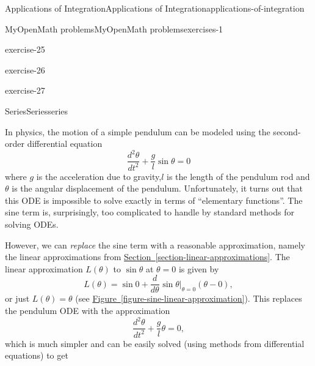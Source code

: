 \documentclass[oneside,10pt,]{book}
\numberwithin{equation}{section}
\newcommand{\dv}[3][]{\dfrac{d^{#1} #2}{d #3^{#1}}}
\begin{document}
\begin{chapterptx}{Applications of Integration}{}{Applications of Integration}{}{}{applications-of-integration}
\begin{exercises-section}{MyOpenMath problems}{}{MyOpenMath problems}{}{}{exercises-1}
\begin{exercisegroup}
\begin{divisionexerciseeg}{25}{}{}{exercise-25}%
\end{divisionexerciseeg}%
\begin{divisionexerciseeg}{26}{}{}{exercise-26}%
\end{divisionexerciseeg}%
\begin{divisionexerciseeg}{27}{}{}{exercise-27}%
\end{divisionexerciseeg}%
\end{exercisegroup}
\par\medskip\noindent
\end{exercises-section}
\end{chapterptx}
%
%
\typeout{************************************************}
\typeout{************************************************}
%
\begin{chapterptx}{Series}{}{Series}{}{}{series}
\begin{introduction}{}%
\hypertarget{p-777}{}%
In physics, the motion of a simple pendulum can be modeled using the second-order differential equation%
\begin{equation*}
\dv[2]{\theta}{t} + \frac{g}{l}\sin\theta = 0
\end{equation*}
where \(g\) is the acceleration due to gravity,\(l\) is the length of the pendulum rod and \(\theta\) is the angular displacement of the pendulum. Unfortunately, it turns out that this ODE is impossible to solve exactly in terms of ``elementary functions''. The sine term is, surprisingly, too complicated to handle by standard methods for solving ODEs.%
\par
\hypertarget{p-778}{}%
However, we can \emph{replace} the sine term with a reasonable approximation, namely the linear approximations from \hyperref[section-linear-approximations]{Section~\ref{section-linear-approximations}}. The linear approximation \(L(\theta)\) to \(\sin\theta\) at \(\theta = 0\) is given by%
\begin{equation*}
L(\theta) = \sin0 + \dv{}{\theta}\sin\theta\Big|_{\theta= 0}(\theta - 0),
\end{equation*}
or just \(L(\theta) = \theta\) (see \hyperref[figure-sine-linear-approximation]{Figure~\ref{figure-sine-linear-approximation}}). This replaces the pendulum ODE with the approximation%
\begin{equation*}
\dv[2]{\theta}{t} + \frac{g}{l}\theta = 0,
\end{equation*}
which is much simpler and can be easily solved (using methods from differential equations) to get%

\end{introduction}
\end{chapterptx}
\end{document}
